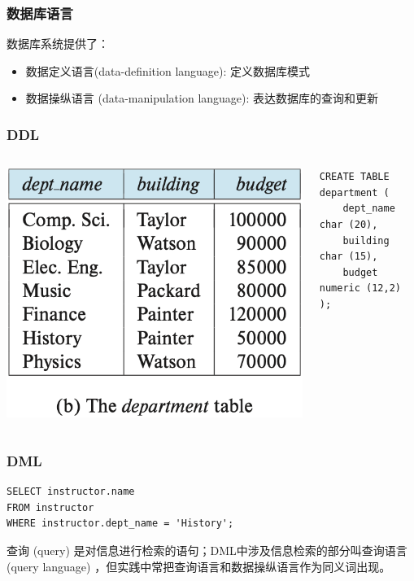 \documentclass[aspectratio=169, 14pt]{beamer}
\begin{document}
\begin{frame}
    \frametitle{数据库语言}
    数据库系统提供了：
    
    \begin{itemize}
        \item 数据定义语言(data-definition language): 定义数据库模式
        \item 数据操纵语言 (data-manipulation language): 表达数据库的查询和更新
    \end{itemize}
\end{frame}
\begin{frame}[fragile]
    \frametitle{DDL}
\begin{columns}
    \includegraphics[width=\textwidth]{table/department} 
    \begin{verbatim}
CREATE TABLE department (
    dept_name   char (20),
    building   char (15),
    budget  numeric (12,2)
);     
    \end{verbatim} 
\end{columns}
\end{frame}

\begin{frame}[fragile]
    \frametitle{DML}
    \begin{verbatim}
SELECT instructor.name
FROM instructor
WHERE instructor.dept_name = 'History';   
    \end{verbatim} 
    查询 (query) 是对信息进行检索的语句；DML中涉及信息检索的部分叫\alert{查询语言 (query language)} ，但实践中常把查询语言和数据操纵语言作为同义词出现。
\end{frame}
\end{document}
